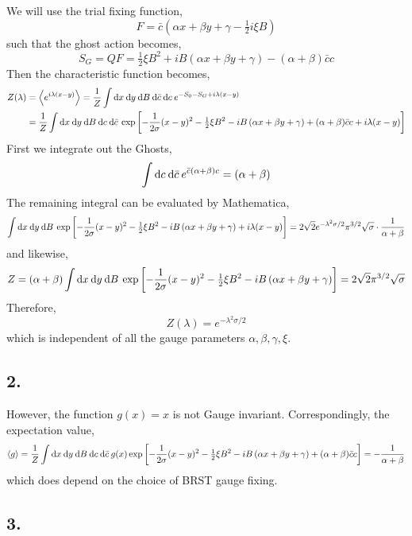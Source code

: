 \documentclass[12pt]{article}
\begin{document}
We will use the trial fixing function,
\[ F = \bar{c} \left( \alpha x + \beta y + \gamma - \tfrac{1}{2} i \xi B \right) \]
such that the ghost action becomes,
\[ S_{G} = QF = \tfrac{1}{2} \xi B^2 + i B\left( \alpha x + \beta y + \gamma \right) - (\alpha + \beta) \bar{c} c \]
Then the characteristic function becomes,
\begin{align*}
Z(\lambda) & = \left< e^{i \lambda (x - y)} \right> = \frac{1}{Z} \int \mathrm{d}x \: \mathrm{d}y \: \mathrm{d}B \: \mathrm{d}\bar{c} \: \mathrm{d}c \: e^{- S_0 - S_G + i \lambda (x - y)}
\\
& = \frac{1}{Z} \int \mathrm{d}x \: \mathrm{d}y \: \mathrm{d}B \: \mathrm{d}c \: \mathrm{d}\bar{c} \: \exp{\left[ - \frac{1}{2\sigma}(x - y)^2 - \tfrac{1}{2} \xi B^2 - i B\left( \alpha x + \beta y + \gamma \right) + (\alpha + \beta) \bar{c} c + i \lambda (x - y) \right]}
\end{align*}
First we integrate out the Ghosts,
\[ \int \mathrm{d}c \: \mathrm{d}\bar{c} \: e^{\bar{c} (\alpha + \beta) c}  = (\alpha + \beta) \]
The remaining integral can be evaluated by Mathematica,
\[ \int \mathrm{d}x \: \mathrm{d}y \: \mathrm{d}B \: \exp{\left[ - \frac{1}{2\sigma}(x - y)^2 - \tfrac{1}{2} \xi B^2 - i B\left( \alpha x + \beta y + \gamma \right) + i \lambda (x - y) \right]} = 2\sqrt{2} e^{-\lambda^2 \sigma/2} \pi^{3/2} \sqrt{\sigma} \cdot \frac{1}{\alpha + \beta} \]
and likewise,
\[ Z = (\alpha + \beta) \int \mathrm{d}x \: \mathrm{d}y \: \mathrm{d}B \: \exp{\left[ - \frac{1}{2\sigma}(x - y)^2 - \tfrac{1}{2} \xi B^2 - i B\left( \alpha x + \beta y + \gamma \right)  \right]} = 2\sqrt{2}  \pi^{3/2} \sqrt{\sigma} \]
Therefore,
\[ Z(\lambda) = e^{-\lambda^2 \sigma / 2} \]
which is independent of all the gauge parameters $\alpha, \beta, \gamma, \xi$. 

\subsection*{2.}

However, the function $g(x) = x$ is not Gauge invariant. Correspondingly, the expectation value,
\[ \left< g \right> = \frac{1}{Z} \int \mathrm{d}x \: \mathrm{d}y \: \mathrm{d}B \: \mathrm{d}c \: \mathrm{d}\bar{c} \: g(x) \exp{\left[ - \frac{1}{2\sigma}(x - y)^2 - \tfrac{1}{2} \xi B^2 - i B\left( \alpha x + \beta y + \gamma \right) + (\alpha + \beta) \bar{c} c \right]}  = - \frac{1}{\alpha + \beta} \]
which does depend on the choice of BRST gauge fixing. 

\subsection*{3.}
\end{document}
